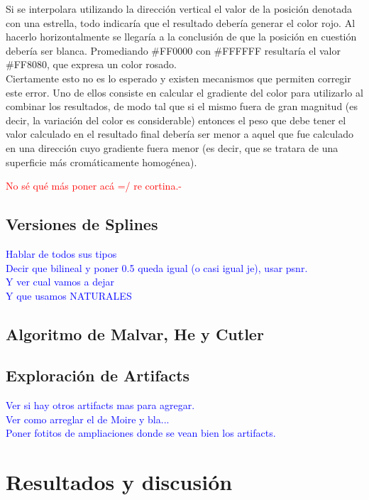 \documentclass[a4paper]{article}
\begin{document}
Si se interpolara utilizando la dirección vertical el valor de la posición denotada con una estrella, todo indicaría que el resultado debería generar el color rojo. Al hacerlo horizontalmente se llegaría a la conclusión de que la posición en cuestión debería ser blanca. Promediando \#FF0000 con \#FFFFFF resultaría el valor \#FF8080, que expresa un color rosado. \\
Ciertamente esto no es lo esperado y existen mecanismos que permiten corregir este error. Uno de ellos consiste en calcular el gradiente del color para utilizarlo al combinar los resultados, de modo tal que si el mismo fuera de gran magnitud (es decir, la variación del color es considerable) entonces el peso que debe tener el valor calculado en el resultado final debería ser menor a aquel que fue calculado en una dirección cuyo gradiente fuera menor (es decir, que se tratara de una superficie más cromáticamente homogénea).

\textcolor{red}{No sé qué más poner acá =/ re cortina.-}

\subsection*{Versiones de Splines}

\textcolor{blue}{Hablar de todos sus tipos\\
Decir que bilineal y poner 0.5 queda igual (o casi igual je), usar psnr.\\
Y ver cual vamos a dejar\\
Y que usamos NATURALES}
\subsection{Algoritmo de Malvar, He y Cutler}


\subsection{Exploraci\'on de Artifacts}

\textcolor{blue}{Ver si hay otros artifacts mas para agregar.\\
Ver como arreglar el de Moire y bla...\\
Poner fotitos de ampliaciones donde se vean bien los artifacts.}


\newpage
\section{Resultados y discusi\'on}
\end{document}
